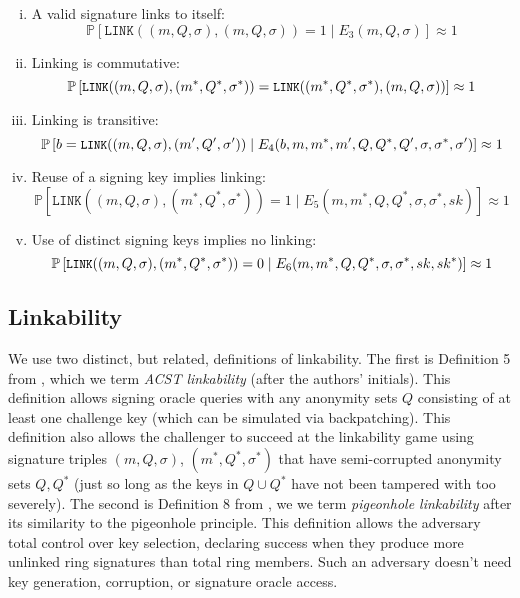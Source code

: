 \documentclass{llncs}
\newcommand{\prob}{\mathbb{P}}
\begin{document}
\begin{definition}
\begin{enumerate}[(i)]
\item A valid signature links to itself: $$\prob\left[\texttt{LINK}((m, Q, \sigma), (m, Q, \sigma)) = 1 \mid E_3(m, Q, \sigma)\right] \approx 1$$

\item Linking is commutative: $${\small \prob\left[\texttt{LINK}((m, Q, \sigma), (m^*, Q^*, \sigma^*)) = \texttt{LINK}((m^*, Q^*, \sigma^*), (m, Q, \sigma))\right] \approx 1}$$

\item Linking is transitive: $${\small \prob\left[b = \texttt{LINK}((m, Q, \sigma), (m^\prime, Q^\prime, \sigma^\prime)) \mid E_4(b, m, m^*, m^\prime, Q, Q^*, Q^\prime, \sigma, \sigma^*, \sigma^\prime)\right] \approx 1}$$

\item Reuse of a signing key implies linking: $$\prob\left[ \texttt{LINK}((m, Q, \sigma), (m^*, Q^*, \sigma^*)) = 1 \mid E_5(m, m^*, Q, Q^*, \sigma, \sigma^*, sk) \right] \approx 1$$

\item Use of distinct signing keys implies no linking: $${\small \prob\left[ \texttt{LINK}((m, Q, \sigma), (m^*, Q^*, \sigma^*)) = 0 \mid E_6(m, m^*, Q, Q^*, \sigma, \sigma^*, sk, sk^*) \right] \approx 1}$$
\end{enumerate}
\end{definition}


\subsection{Linkability}

We use two distinct, but related, definitions of linkability. The first is Definition 5 from \cite{au2006short}, which we term \textit{ACST linkability} (after the authors' initials). This definition allows signing oracle queries with any anonymity sets $Q$ consisting of at least one challenge key (which can be simulated via backpatching). This definition also allows the challenger to succeed at the linkability game using signature triples $(m, Q, \sigma)$, $(m^*, Q^*, \sigma^*)$ that have semi-corrupted anonymity sets $Q, Q^*$ (just so long as the keys in $Q \cup Q^*$ have not been tampered with too severely). The second is Definition 8 from \cite{backes2019ring}, we we term \textit{pigeonhole linkability} after its similarity to the pigeonhole principle. This definition allows the adversary total control over key selection, declaring success when they produce more unlinked ring signatures than total ring members. Such an adversary doesn't need key generation, corruption, or signature oracle access.
\end{document}
